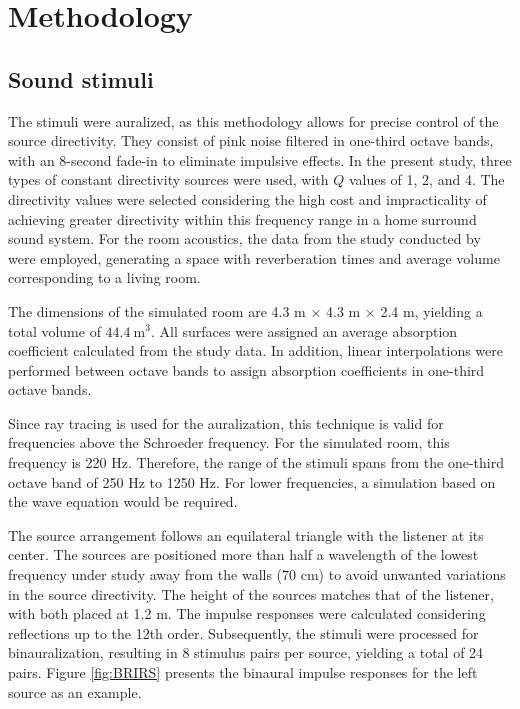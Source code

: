\section{\large\textbf{Methodology}}
\subsection{Sound stimuli}

The stimuli were auralized, as this methodology allows for precise control of the source directivity. They consist of pink noise filtered in one-third octave bands, with an 8-second fade-in to eliminate impulsive effects. In the present study, three types of constant directivity sources were used, with $Q$ values of 1, 2, and 4. The directivity values were selected considering the high cost and impracticality of achieving greater directivity within this frequency range in a home surround sound system. For the room acoustics, the data from the study conducted by \textcite{jackson} were employed, generating a space with reverberation times and average volume corresponding to a living room.

The dimensions of the simulated room are 4.3 m × 4.3 m × 2.4 m, yielding a total volume of $44.4~\text{m}^3$. All surfaces were assigned an average absorption coefficient calculated from the study data. In addition, linear interpolations were performed between octave bands to assign absorption coefficients in one-third octave bands.

Since ray tracing is used for the auralization, this technique is valid for frequencies above the Schroeder frequency. For the simulated room, this frequency is 220 Hz. Therefore, the range of the stimuli spans from the one-third octave band of 250 Hz to 1250 Hz. For lower frequencies, a simulation based on the wave equation would be required.

The source arrangement follows an equilateral triangle with the listener at its center. The sources are positioned more than half a wavelength of the lowest frequency under study away from the walls (70 cm) to avoid unwanted variations in the source directivity. The height of the sources matches that of the listener, with both placed at 1.2 m.
The impulse responses were calculated considering reflections up to the 12th order. Subsequently, the stimuli were processed for binauralization, resulting in 8 stimulus pairs per source, yielding a total of 24 pairs. Figure \ref{fig:BRIRS} presents the binaural impulse responses for the left source as an example.

